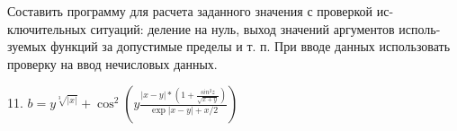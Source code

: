 Составить программу для расчета заданного значения с проверкой ис-
ключительных ситуаций: деление на нуль, выход значений аргументов исполь-
зуемых функций за допустимые пределы и т. п. При вводе данных использовать
проверку на ввод нечисловых данных.

11.
$ 
	b = y^{\sqrt[3]{\lvert x \rvert}} + \cos^2{(y\frac{\lvert x - y \rvert * (1 + \frac{sin^2{z}}{\sqrt{x + y}})}{\exp{\lvert x - y \rvert} + x / 2})}
$
